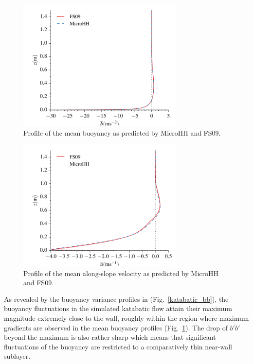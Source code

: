 \documentclass[gmd]{copernicus}
\begin{document}
\begin{figure}
\centerline{\includegraphics[width=8.3cm]{figs/katabatic_b.pdf}}
\caption{Profile of the mean buoyancy as predicted by MicroHH and FS09.}
\label{katabatic_b}
\end{figure}
 
\begin{figure}
\centerline{\includegraphics[width=8.3cm]{figs/katabatic_u.pdf}}
\caption{Profile of the mean along-slope velocity as predicted by MicroHH and FS09.}
\label{katabatic_u}
\end{figure}

As revealed by the buoyancy variance profiles in (Fig.~\ref{katabatic_bb}), the buoyancy fluctuations in the simulated katabatic flow attain their maximum magnitude extremely close to the wall, roughly within the region where maximum gradients are observed in the mean buoyancy profiles (Fig.~\ref{katabatic_b}). The drop of $\overline{b'b'}$ beyond the maximum is also rather sharp which means that significant fluctuations of the buoyancy are restricted to a comparatively thin near-wall sublayer.
\end{document}
